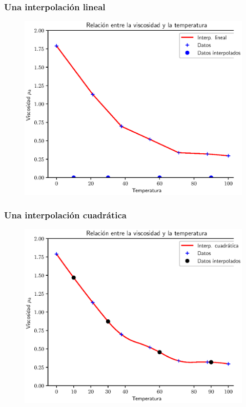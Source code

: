 \documentclass[12pt]{beamer}
\begin{document}
\begin{frame}
\frametitle{Una interpolación lineal}
\begin{figure}
    \centering
    \includegraphics[scale=0.575]{Imagenes/Intro_Interpolacion_04.eps}
\end{figure}
\end{frame}
\begin{frame}
\frametitle{Una interpolación cuadrática}
\begin{figure}
    \centering
    \includegraphics[scale=0.575]{Imagenes/Intro_Interpolacion_05.eps}
\end{figure}
\end{frame} 
\end{document}
